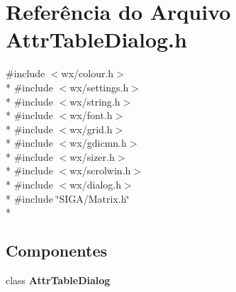 \section{Referência do Arquivo Attr\+Table\+Dialog.\+h}
\label{_attr_table_dialog_8h}
{\ttfamily \#include $<$wx/colour.\+h$>$}\\*
{\ttfamily \#include $<$wx/settings.\+h$>$}\\*
{\ttfamily \#include $<$wx/string.\+h$>$}\\*
{\ttfamily \#include $<$wx/font.\+h$>$}\\*
{\ttfamily \#include $<$wx/grid.\+h$>$}\\*
{\ttfamily \#include $<$wx/gdicmn.\+h$>$}\\*
{\ttfamily \#include $<$wx/sizer.\+h$>$}\\*
{\ttfamily \#include $<$wx/scrolwin.\+h$>$}\\*
{\ttfamily \#include $<$wx/dialog.\+h$>$}\\*
{\ttfamily \#include \char`\"{}S\+I\+G\+A/\+Matrix.\+h\char`\"{}}\\*
\subsection*{Componentes}
\begin{DoxyCompactItemize}
\item 
class {\bf Attr\+Table\+Dialog}
\end{DoxyCompactItemize}

